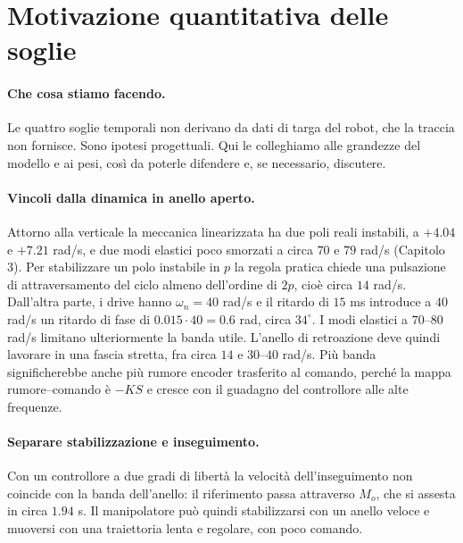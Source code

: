 \section{Motivazione quantitativa delle soglie}\label{sec:motivazione-soglie}
\paragraph{Che cosa stiamo facendo.} Le quattro soglie temporali non
derivano da dati di targa del robot, che la traccia non fornisce.
Sono ipotesi progettuali. Qui le colleghiamo alle grandezze del modello
e ai pesi, così da poterle difendere e, se necessario, discutere.

\paragraph{Vincoli dalla dinamica in anello aperto.} Attorno alla
verticale la meccanica linearizzata ha due poli reali instabili, a
$+4.04$ e $+7.21$ rad/s, e due modi elastici poco smorzati a circa
$70$ e $79$ rad/s (Capitolo 3). Per stabilizzare un polo instabile in
$p$ la regola pratica chiede una pulsazione di attraversamento del
ciclo almeno dell'ordine di $2p$, cioè circa $14$ rad/s. Dall'altra
parte, i drive hanno $\omega_n=40$ rad/s e il ritardo di $15$ ms
introduce a $40$ rad/s un ritardo di fase di $0.015\cdot40=0.6$ rad,
circa $34^\circ$. I modi elastici a $70$--$80$ rad/s limitano
ulteriormente la banda utile. L'anello di retroazione deve quindi
lavorare in una fascia stretta, fra circa $14$ e $30$--$40$ rad/s.
Più banda significherebbe anche più rumore encoder trasferito al
comando, perché la mappa rumore--comando è $-KS$ e cresce con il
guadagno del controllore alle alte frequenze.

\paragraph{Separare stabilizzazione e inseguimento.} Con un
controllore a due gradi di libertà la velocità dell'inseguimento non
coincide con la banda dell'anello: il riferimento passa attraverso
$M_o$, che si assesta in circa $1.94$ s. Il manipolatore può quindi
stabilizzarsi con un anello veloce e muoversi con una traiettoria
lenta e regolare, con poco comando.

